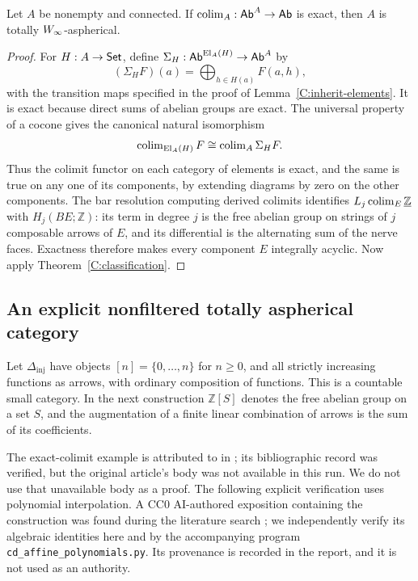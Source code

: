 \begin{proposition}\label{C:exact-sufficient}
Let $A$ be nonempty and connected. If $\operatorname{colim}_A:\mathsf{Ab}^A\to\mathsf{Ab}$ is exact, then $A$ is totally $W_{\infty}$-aspherical.
\end{proposition}
\begin{proof}
For $H:A\to\mathsf{Set}$, define $\Sigma_H:\mathsf{Ab}^{\operatorname{El}_A(H)}\to\mathsf{Ab}^A$ by
\[
 (\Sigma_HF)(a)=\bigoplus_{h\in H(a)}F(a,h),
\]
with the transition maps specified in the proof of Lemma~\ref{C:inherit-elements}. It is exact because direct sums of abelian groups are exact. The universal property of a cocone gives the canonical natural isomorphism
\[
 \operatorname{colim}_{\operatorname{El}_A(H)}F
   \cong\operatorname{colim}_A\Sigma_HF.
\]
Thus the colimit functor on each category of elements is exact, and the same is true on any one of its components, by extending diagrams by zero on the other components. The bar resolution computing derived colimits identifies
$L_j\operatorname{colim}_E\underline{\mathbb Z}$ with $H_j(BE;\mathbb Z)$: its term in degree $j$ is the free abelian group on strings of $j$ composable arrows of $E$, and its differential is the alternating sum of the nerve faces. Exactness therefore makes every component $E$ integrally acyclic. Now apply Theorem~\ref{C:classification}.
\end{proof}

\subsection{An explicit nonfiltered totally aspherical category}

\begin{definition}\label{C:delta-definition}
Let $\Delta_{\mathrm{inj}}$ have objects $[n]=\{0,\ldots,n\}$ for $n\geq0$, and all strictly increasing functions as arrows, with ordinary composition of functions. This is a countable small category. In the next construction $\mathbb Z[S]$ denotes the free abelian group on a set $S$, and the augmentation of a finite linear combination of arrows is the sum of its coefficients.
\end{definition}

The exact-colimit example is attributed to \citet{Isbell1974Exact} in \citet[Section~2.3, after Theorem~2.5]{Husainov2002Dimension}; its bibliographic record was verified, but the original article's body was not available in this run. We do not use that unavailable body as a proof. The following explicit verification uses polynomial interpolation. A CC0 AI-authored exposition containing the construction was found during the literature search \citep[Section~4]{OpenMaths2026Derived}; we independently verify its algebraic identities here and by the accompanying program \texttt{cd\_affine\_polynomials.py}. Its provenance is recorded in the report, and it is not used as an authority.

